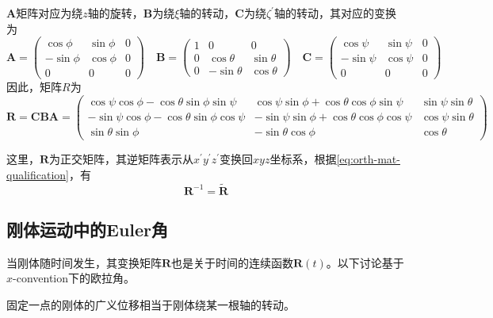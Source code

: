 $\bm{A}$矩阵对应为绕$z$轴的旋转，$\bm{B}$为绕$\xi$轴的转动，$\bm{C}$为绕$\zeta^{\prime}$轴的转动，其对应的变换为
\begin{equation}
    \bm{A} = \begin{pmatrix}
        \cos{\phi} & \sin{\phi} & 0 \\
        -\sin{\phi} & \cos{\phi} & 0 \\
        0          & 0          & 0
    \end{pmatrix}
    \quad
    \bm{B} = \begin{pmatrix}
        1           & 0             & 0 \\
        0           & \cos{\theta}  & \sin{\theta} \\
        0           & -\sin{\theta} & \cos{\theta}
    \end{pmatrix}
    \quad
    \bm{C} = \begin{pmatrix}
        \cos{\psi} & \sin{\psi} & 0 \\
        -\sin{\psi} & \cos{\psi} & 0 \\
        0          & 0          & 0
    \end{pmatrix}
\end{equation}
因此，矩阵$R$为
\begin{equation}
    \bm{R} = \bm{CBA}
           = \begin{pmatrix}
            \cos{\psi}\cos{\phi} - \cos{\theta}\sin{\phi}\sin{\psi} & \cos{\psi}\sin{\phi} + \cos{\theta}\cos{\phi}\sin{\psi} & \sin{\psi}\sin{\theta} \\
            -\sin{\psi}\cos{\phi} - \cos{\theta}\sin{\phi}\cos{\psi} & -\sin{\psi}\sin{\phi} + \cos{\theta}\cos{\phi}\cos{\psi} & \cos{\psi}\sin{\theta} \\
            \sin{\theta}\sin{\phi} & -\sin{\theta}\cos{\phi} & \cos{\theta}
           \end{pmatrix}
		   \label{eq:Euler-rot-mat}
\end{equation}

这里，$\bm{R}$为正交矩阵，其逆矩阵表示从$x^{\prime}y^{\prime}z^{\prime}$变换回$xyz$坐标系，根据\cref{eq:orth-mat-qualification}，有
\begin{equation}
    \bm{R}^{-1} = \tilde{\bm{R}}
\end{equation}

\subsection{刚体运动中的Euler角}
当刚体随时间发生，其变换矩阵$\bm{R}$也是关于时间的连续函数$\bm{R}(t)$。以下讨论基于$x$-convention下的欧拉角。
\begin{theorem}[Euler定理]
    固定一点的刚体的广义位移相当于刚体绕某一根轴的转动。
\end{theorem}

